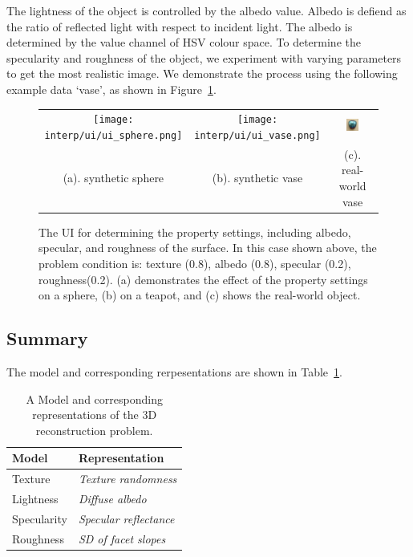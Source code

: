 The lightness of the object is controlled by the albedo value. Albedo is defiend as the ratio of reflected light with respect to incident light. The albedo is determined by the value channel of HSV colour space. To determine the specularity and roughness of the object, we experiment with varying parameters to get the most realistic image. We demonstrate the process using the following example data `vase', as shown in Figure~\ref{fig:ui}.
\begin{figure}[!htbp]
\centering
\begin{tabular}{ccc}
  \texttt{[image: interp/ui/ui\_sphere.png]}&
  \texttt{[image: interp/ui/ui\_vase.png]}&
  \includegraphics[width=0.3\textwidth]{img/interp/real_world_img/vase/vase.jpg}\\
  (a). synthetic sphere & (b). synthetic vase & (c). real-world vase\\
\end{tabular}
\caption{The UI for determining the property settings, including albedo, specular, and roughness of the surface. In this case shown above, the problem condition is: texture (0.8), albedo (0.8), specular (0.2), roughness(0.2). (a) demonstrates the effect of the property settings on a sphere, (b) on a teapot, and (c) shows the real-world object.}
\label{fig:ui}
\end{figure}

\subsection{Summary}
The model and corresponding rerpesentations are shown in Table~\ref{tab:3DRecon_model_repre}.
\begin{table}[!htbp]
  \centering
  \begin{tabular}{l|l}
  \toprule
  \textbf{Model} & \textbf{Representation}\\
  \midrule
  Texture & \textit{Texture randomness}\\
  Lightness & \textit{Diffuse albedo}\\
  Specularity & \textit{Specular reflectance}\\
  Roughness & \textit{SD of facet slopes}\\
  \bottomrule
  \end{tabular}
  \caption{A Model and corresponding representations of the 3D reconstruction problem.}
  \label{tab:3DRecon_model_repre}
\end{table}

